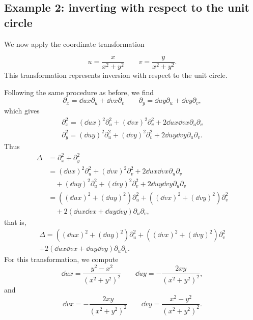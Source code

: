 \subsection{Example 2: inverting with respect to the unit circle}
We now apply the coordinate transformation

\begin{equation*}
	u=\frac{x}{x^2+y^2} \qquad
	v=\frac{y}{x^2+y^2}.
\end{equation*}
This transformation represents inversion with respect to the unit circle.

Following the same procedure as before, we find
\begin{equation*}
	\partial_x=\dd{u}{x}\partial_u + \dd{v}{x}\partial_v \qquad
	\partial_y=\dd{u}{y}\partial_u + \dd{v}{y}\partial_v,
\end{equation*}
which gives
\begin{align*}
	\partial_x^2=
	  \left(\dd{u}{x}\right)^2\partial_u^2
	+ \left(\dd{v}{x}\right)^2\partial_v^2
	+ 2\dd{u}{x}\dd{v}{x}\partial_u\partial_v \\
	\partial_y^2=
	  \left(\dd{u}{y}\right)^2\partial_u^2
	+ \left(\dd{v}{y}\right)^2\partial_v^2
	+ 2\dd{u}{y}\dd{v}{y}\partial_u\partial_v.
\end{align*}
Thus
\begin{align*}
	\Delta &= \partial_x^2+\partial_y^2\\
	       &= \left(\dd{u}{x}\right)^2\partial_u^2
	+ \left(\dd{v}{x}\right)^2\partial_v^2
	+ 2\dd{u}{x}\dd{v}{x}\partial_u\partial_v\\
	       &\quad +
	  \left(\dd{u}{y}\right)^2\partial_u^2
	+ \left(\dd{v}{y}\right)^2\partial_v^2
	+ 2\dd{u}{y}\dd{v}{y}\partial_u\partial_v\\
	       &=\left(\left(\dd{u}{x}\right)^2
	+\left(\dd{u}{y}\right)^2\right)\partial_u^2
	+\left(\left(\dd{v}{x}\right)^2
	+\left(\dd{v}{y}\right)^2\right)\partial_v^2\\
	       &\quad +2\left(\dd{u}{x}\dd{v}{x}
	+\dd{u}{y}\dd{v}{y}\right)\partial_u\partial_v,
\end{align*}
that is,
\begin{multline}\label{laplacianuv}
	\Delta =\left(\left(\dd{u}{x}\right)^2
	+\left(\dd{u}{y}\right)^2\right)\partial_u^2
	       +\left(\left(\dd{v}{x}\right)^2
	+\left(\dd{v}{y}\right)^2\right)\partial_v^2\\
	       +2\left(\dd{u}{x}\dd{v}{x}
	+\dd{u}{y}\dd{v}{y}\right)\partial_u\partial_v.
\end{multline}
For this transformation, we compute
\begin{equation}\label{partialu}
	\dd{u}{x}=\frac{y^2-x^2}{(x^2+y^2)^2} \qquad
	\dd{u}{y}=-\frac{2xy}{(x^2+y^2)^2},
\end{equation}
and
\begin{equation*}
	\dd{v}{x}=-\frac{2xy}{(x^2+y^2)^2} \qquad
	\dd{v}{y}=\frac{x^2-y^2}{(x^2+y^2)^2}.
\end{equation*}

